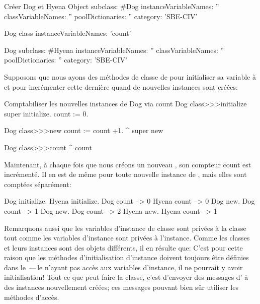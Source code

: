\documentclass[a4paper,10pt,twoside]{book}
\begin{document}
\newpage
\begin{classdef}[dog]{Cr\'eer Dog et Hyena}
Object subclass: #Dog
	instanceVariableNames: ''
	classVariableNames: ''
	poolDictionaries: ''
	category: 'SBE-CIV'

Dog class
	instanceVariableNames: 'count'

Dog subclass: #Hyena
	instanceVariableNames: ''
	classVariableNames: ''
	poolDictionaries: ''
	category: 'SBE-CIV'
\end{classdef}

Supposons que nous ayons des m\'ethodes de classe de  pour initialiser sa variable  \`a  et pour incr\'ementer cette derni\`ere quand de nouvelles instances sont cr\'e\'ees:
\begin{method}[dogcount]{Comptabiliser les nouvelles instances de Dog via count}
Dog class>>>initialize
	super initialize.
	count := 0.

Dog class>>>new
	count := count +1.
	^ super new

Dog class>>>count
	^ count
\end{method}

Maintenant, \`a chaque fois que nous cr\'eons un nouveau , son compteur
count est incr\'ement\'e. Il en est de m\^eme pour toute nouvelle instance de , mais elles sont compt\'ees s\'epar\'ement:
\begin{code}{}
Dog initialize.
Hyena initialize.
Dog count     --> 0
Hyena count --> 0
Dog new.
Dog count     --> 1
Dog new.
Dog count     --> 2
Hyena new.
Hyena count --> 1
\end{code}

Remarquons aussi que les variables d'instance de classe sont priv\'ees \`a la classe tout comme les variables d'instance sont priv\'ees \`a l'instance. 
Comme les classes et leurs instances sont des objets diff\'erents,
il en r\'esulte que:
C'est pour cette raison que les m\'ethodes d'initialisation d'instance doivent 
toujours \^etre d\'efinies dans le \,---\,le  n'ayant pas acc\`es aux variables d'instance, il ne pourrait y avoir initiali\-sation!  
Tout ce que peut faire la classe, c'est d'envoyer des messages d' \`a des instances nouvellement cr\'e\'ees; ces messages pouvant bien s\^ur utiliser les m\'ethodes d'acc\`es.
\end{document}

